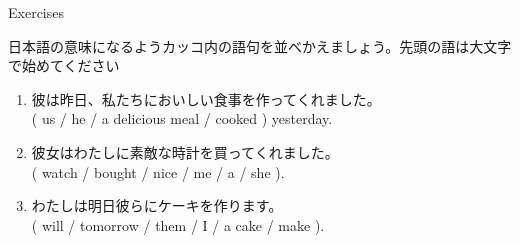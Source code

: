 \documentclass[aspectratio=169,xcolor={dvipsnames,table}]{beamer}
\begin{document}
\begin{frame}[plain]{Exercises}

{\small 日本語の意味になるようカッコ内の語句を並べかえましょう。先頭の語は大文字で始めてください}
 \hfill{\scriptsize {}}
\begin{enumerate}
 \item {\small 彼は昨日、私たちにおいしい食事を作ってくれました。}\\
       ( us / he / a delicious meal / cooked ) yesterday.\\
 \item {\small 彼女はわたしに素敵な時計を買ってくれました。}\\
       ( watch / bought / nice / me / a / she ).\\
 \item {\small わたしは明日彼らにケーキを作ります。}\\
( will / tomorrow / them / I / a cake / make ).\\
\end{enumerate}
\end{frame}
\end{document}
